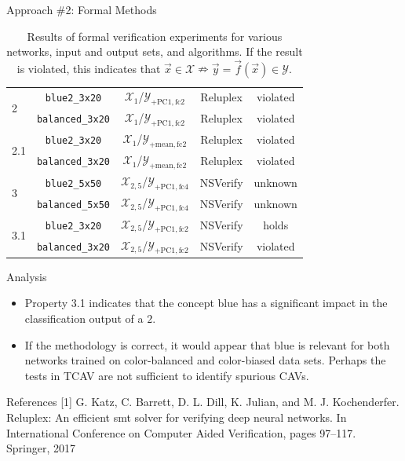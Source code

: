\documentclass[final]{beamer}
\begin{document}
\begin{frame}[fragile]{}
\begin{textblock}{\colwidth}
\begin{paddedBlock}{Approach \#2: Formal Methods}
\begin{table}
{\begin{tabular}{lcccc}
\multirow{2}{*}{2} & \texttt{blue2\_3x20} & $\mathcal{X}_1$/$\mathcal{Y}_{+ \text{PC1}, \text{fc2}}$ &  Reluplex &  violated \\
                   & \texttt{balanced\_3x20} & $\mathcal{X}_1$/$\mathcal{Y}_{+ \text{PC1}, \text{fc2}}$ &  Reluplex &  violated \\
\hline
\multirow{2}{*}{2.1} & \texttt{blue2\_3x20} & $\mathcal{X}_1$/$\mathcal{Y}_{+ \text{mean}, \text{fc2}}$ &  Reluplex &  violated \\
                   & \texttt{balanced\_3x20} & $\mathcal{X}_1$/$\mathcal{Y}_{+ \text{mean}, \text{fc2}}$ &  Reluplex &  violated \\
\hline
\multirow{2}{*}{3} & \texttt{blue2\_5x50} & $\mathcal{X}_{2,5}$/$\mathcal{Y}_{+ \text{PC1}, \text{fc4}}$ &  NSVerify &  unknown \\
                   & \texttt{balanced\_5x50} & $\mathcal{X}_{2,5}$/$\mathcal{Y}_{+ \text{PC1}, \text{fc4}}$ &  NSVerify &  unknown \\
\hline
\multirow{2}{*}{3.1} & \texttt{blue2\_3x20} & $\mathcal{X}_{2,5}$/$\mathcal{Y}_{+ \text{PC1}, \text{fc2}}$ &  NSVerify &  holds \\
                   & \texttt{balanced\_3x20} & $\mathcal{X}_{2,5}$/$\mathcal{Y}_{+ \text{PC1}, \text{fc2}}$ &  NSVerify &  violated \\
\hline
\end{tabular}
}
\caption{Results of formal verification experiments for various networks, input and output sets, and algorithms. If the result is violated, this indicates that $\vec x \in \mathcal{X} \nRightarrow \vec y = \vec f(\vec x) \in \mathcal{Y}$.}
\label{table:properties}
\end{table}

\alert{Analysis}

\begin{itemize}
  \item Property 3.1 indicates that the concept blue has a significant impact in the classification output of a $2$.
  \item If the methodology is correct, it would appear that blue is relevant for both networks trained on color-balanced and color-biased data sets. Perhaps the tests in TCAV are not sufficient to identify spurious CAVs.
\end{itemize}

\end{paddedBlock}


\begin{paddedBlock}{References}
\footnotesize{[1] G. Katz, C. Barrett, D. L. Dill, K. Julian, and M. J. Kochenderfer. Reluplex: An efficient smt solver for verifying deep neural networks. In International Conference on Computer Aided Verification, pages 97–117. Springer, 2017}


\end{paddedBlock}
\end{textblock}
\end{frame}
\end{document}
